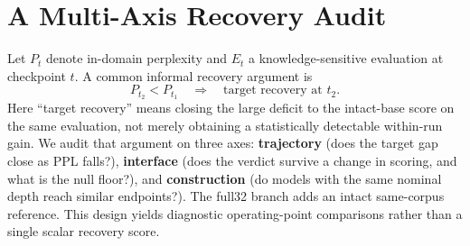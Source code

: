 \section{A Multi-Axis Recovery Audit}
\label{sec:observation}

Let $P_t$ denote in-domain perplexity and $E_t$ a knowledge-sensitive
evaluation at checkpoint $t$. A common informal recovery argument is
\[
P_{t_2}<P_{t_1}\quad\Longrightarrow\quad
\text{target recovery at }t_2 .
\]
Here ``target recovery'' means closing the large deficit to the intact-base
score on the same evaluation, not merely obtaining a statistically detectable
within-run gain. We audit that argument on three axes:
\textbf{trajectory} (does the target gap close as PPL falls?),
\textbf{interface} (does the verdict survive a change in scoring, and what is
the null floor?), and \textbf{construction} (do models with the same nominal
depth reach similar endpoints?). The full32 branch adds an intact
same-corpus reference. This design yields diagnostic operating-point
comparisons rather than a single scalar recovery score.
